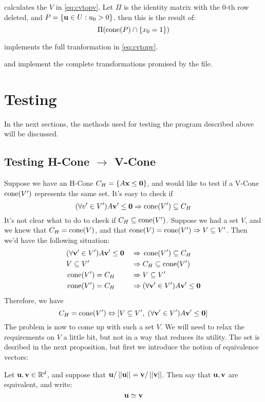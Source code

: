  calculates the $V$ in \eqref{eq:cvtopv}.  Let $\Pi$ is the identity matrix with the $0$-th row deleted, and $P = \left\{\mathbf{u} \in U : u_0 > 0\right\}$. then this is the result of:
  \[ \Pi(\operatorname{cone}(P) \cap \left\{x_0 = 1\right\}) \]
\lstnormalizedP

 implements the full tranformation in \eqref{eq:cvtopv}.
\lstvconetovpoly

 and  implement the complete transformations promised by the file.
\lsthpolytovpoly
\lstvpolytohpoly

\section{Testing}

In the next sections, the methods used for testing the program described above will be discussed.

\subsection{Testing H-Cone $\to$ V-Cone}
Suppose we have an H-Cone $C_H = \left\{A\mathbf{x}\leq\mathbf{0}\right\}$, and would like to test if a V-Cone $\operatorname{cone}(V')$ represents the same set.  It's easy to check if
  \[ (\forall v' \in V') A\mathbf{v}'\leq\mathbf{0} \Rightarrow \operatorname{cone}(V') \subseteq C_H \]
It's not clear what to do to check if $C_H \subseteq \operatorname{cone}(V')$.  Suppose we had a set $V$, and we knew that $C_H = \operatorname{cone}(V)$, and that $\operatorname{cone}(V) = \operatorname{cone}(V') \Rightarrow V \subseteq V'$.  Then we'd have the following situation:
\begin{alignat*}{2}
  &(\forall \mathbf{v}'\in V') A\mathbf{v}'\leq\mathbf{0} \;&\Rightarrow&\; \operatorname{cone}(V') \subseteq C_H \\
  &V \subseteq V'                 \;&\Rightarrow&\; C_H \subseteq \operatorname{cone}(V') \\
  &\operatorname{cone}(V') = C_H                \;&\Rightarrow&\; V \subseteq V' \\
  &\operatorname{cone}(V') = C_H                \;&\Rightarrow&\; (\forall \mathbf{v}'\in V') A\mathbf{v}'\leq\mathbf{0}
\end{alignat*}
Therefore, we have
\[ C_H = \operatorname{cone}(V') \Leftrightarrow \left[ V \subseteq V',\;(\forall \mathbf{v}'\in V') A\mathbf{v}'\leq\mathbf{0} \right] \]  The problem is now to come up with such a set $V$.  We will need to relax the requirements on $V$ a little bit, but not in a way that reduces its utility.  The set is desribed in the next proposition, but first we introduce the notion of equivalence vectors:

\begin{Def}
  Let $\mathbf{u},\mathbf{v} \in \mathbb{R}^d$, and suppose that $\mathbf{u}/\left|\left|\mathbf{u}\right|\right| = \mathbf{v}/\left|\left|\mathbf{v}\right|\right|$.  Then say that $\mathbf{u},\mathbf{v}$ are equivalent, and write:
  \[ \mathbf{u} \simeq \mathbf{v} \]
\end{Def}

